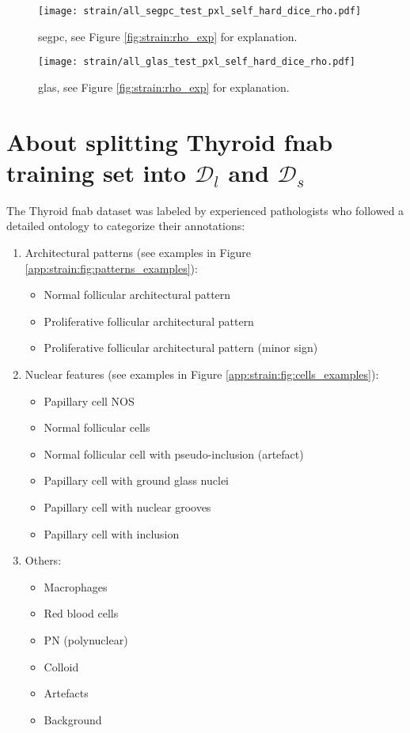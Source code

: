 \begin{figure}
    \centering
    \texttt{[image: strain/all\_segpc\_test\_pxl\_self\_hard\_dice\_rho.pdf]}
    \caption{\acrshort{segpc}, see Figure \ref{fig:strain:rho_exp} for explanation.}
    \label{app:strain:fig:rho_exp_segpc}
\end{figure} 

\begin{figure}
    \centering
    \texttt{[image: strain/all\_glas\_test\_pxl\_self\_hard\_dice\_rho.pdf]}
    \caption{\acrshort{glas}, see Figure \ref{fig:strain:rho_exp} for explanation.}
    \label{app:strain:fig:rho_exp_glas}
\end{figure}
  
\section{About splitting Thyroid \acrshort{fnab} training set into $\mathcal{D}_l$ and $\mathcal{D}_s$}
\label{app:strain:sec:thyroidsplit}

The Thyroid \acrshort{fnab} dataset was labeled by experienced pathologists who followed a detailed ontology to categorize their annotations:


\begin{enumerate}
	\item Architectural patterns (see examples in Figure \ref{app:strain:fig:patterns_examples}):
	\begin{itemize}
		\item Normal follicular architectural pattern
		\item Proliferative follicular architectural pattern
		\item Proliferative follicular architectural pattern (minor sign)
	\end{itemize}
	\item Nuclear features (see examples in Figure \ref{app:strain:fig:cells_examples}):
	\begin{itemize}
		\item Papillary cell NOS
		\item Normal follicular cells
		\item Normal follicular cell with pseudo-inclusion (artefact)
		\item Papillary cell with ground glass nuclei
		\item Papillary cell with nuclear grooves
		\item Papillary cell with inclusion
	\end{itemize}
	\item Others:
	\begin{itemize}
		\item Macrophages
		\item Red blood cells
		\item PN (polynuclear)
		\item Colloid
		\item Artefacts
		\item Background
	\end{itemize}
\end{enumerate}

